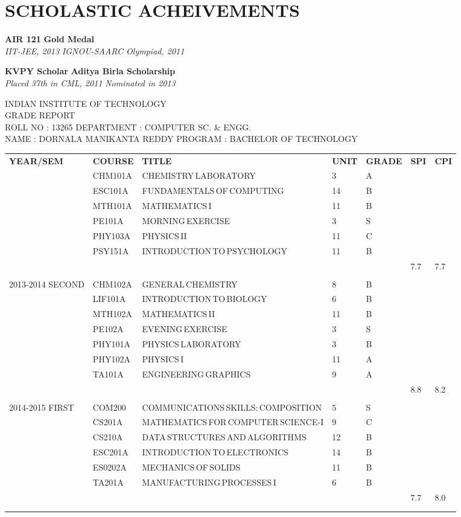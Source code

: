 \message{ !name(Resume.tex)}\documentclass{article}
\newcommand{\sepspace}{\vspace*{1em}}
\newcommand{\NewPart}[1]{\section*{\uppercase{#1}}}
\newcommand{\ScholasticAcheivements}[4]{
		\noindent \textbf{#1} \hfill \textbf{#2} \\
		\textit{#3}	 \hfill	 \textit{ #4} 	
		\normalsize \par}
\newcommand{\transcriptentry}[6]{
	\tiny{#1} & \tiny{#2} & \tiny{#3} & \tiny{#4} & \tiny{#5} & \tiny{#6} \\ 
}
\begin{document}
\NewPart{Scholastic Acheivements}{}
\ScholasticAcheivements{AIR 121}{Gold Medal}{IIT-JEE, 2013}{IGNOU-SAARC Olympiad, 2011}
\sepspace
\ScholasticAcheivements{KVPY Scholar}{Aditya Birla Scholarship}{Placed 37th in CML, 2011}{Nominated in 2013}
\sepspace
\begin{center}
\tiny{INDIAN INSTITUTE OF TECHNOLOGY}\\
\tiny{GRADE REPORT}\\
\tiny{ROLL NO : 13265} \hfill \tiny{DEPARTMENT : COMPUTER SC. \& ENGG.}\\
\tiny{NAME : DORNALA MANIKANTA REDDY} \hfill \tiny{PROGRAM : BACHELOR OF TECHNOLOGY}\\

\begin{tabular}{ m{5em}  m{1.5cm} m{5cm} m{0.5cm} m{0.7cm} m{0.3cm} m{0.5cm} } 
\hdashline
\tiny{\textbf{YEAR/SEM}} & \transcriptentry{\textbf{COURSE}}{\textbf{TITLE}}{\textbf{UNIT}}{\textbf{GRADE}}{\textbf{SPI}}{\textbf{CPI}}
\hdashline
\multirow{7}{5em}{\tiny{2013-2014 FIRST}}
	& \transcriptentry{CHM101A}{CHEMISTRY\,LABORATORY}{3}{A}{}{}
	& \transcriptentry{ESC101A}{FUNDAMENTALS\,OF\,COMPUTING}{14}{B}{}{}
	& \transcriptentry{MTH101A}{MATHEMATICS\,I}{11}{B}{}{}
	& \transcriptentry{PE101A}{MORNING\,EXERCISE}{3}{S}{}{}
	& \transcriptentry{PHY103A}{PHYSICS\,II}{11}{C}{}{}
	& \transcriptentry{PSY151A}{INTRODUCTION\,TO\,PSYCHOLOGY}{11}{B}{}{}
	& \transcriptentry{}{}{}{}{7.7}{7.7}
	\\
\multirow{7}{5em}{\tiny{2013-2014 SECOND}}
	& \transcriptentry{CHM102A}{GENERAL\,CHEMISTRY}{8}{B}{}{}
	& \transcriptentry{LIF101A}{INTRODUCTION\,TO\,BIOLOGY}{6}{B}{}{}
	& \transcriptentry{MTH102A}{MATHEMATICS\,II}{11}{B}{}{}
	& \transcriptentry{PE102A}{EVENING\,EXERCISE}{3}{S}{}{}
	& \transcriptentry{PHY101A}{PHYSICS\,LABORATORY}{3}{B}{}{}
	& \transcriptentry{PHY102A}{PHYSICS\,I}{11}{A}{}{}
	& \transcriptentry{TA101A}{ENGINEERING\,GRAPHICS}{9}{A}{}{}
	& \transcriptentry{}{}{}{}{8.8}{8.2}
	\\	
\multirow{7}{5em}{\tiny{2014-2015 FIRST}}
	& \transcriptentry{COM200}{COMMUNICATIONS\,SKILLS:\,COMPOSITION}{5}{S}{}{}
	& \transcriptentry{CS201A}{MATHEMATICS\,FOR\,COMPUTER\,SCIENCE-I}{9}{C}{}{}
	& \transcriptentry{CS210A}{DATA\,STRUCTURES\,AND\,ALGORITHMS}{12}{B}{}{}
	& \transcriptentry{ESC201A}{INTRODUCTION\,TO\,ELECTRONICS}{14}{B}{}{}
	& \transcriptentry{ES0202A}{MECHANICS\,OF\,SOLIDS}{11}{B}{}{}
	& \transcriptentry{TA201A}{MANUFACTURING\,PROCESSES\,I}{6}{B}{}{}
	& \transcriptentry{}{}{}{}{7.7}{8.0}\\
\hdashline
\end{tabular}
\end{center}

\end{document}
